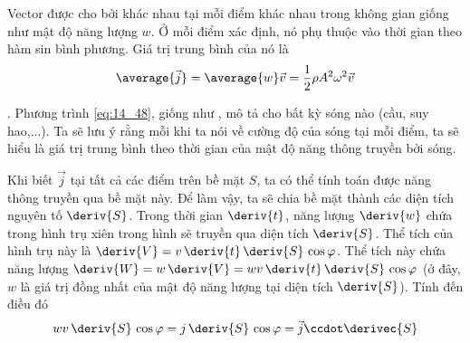 Vector được cho bởi  khác nhau tại mỗi điểm khác nhau trong không gian giống như mật độ năng lượng $w$. Ở mỗi điểm xác định, nó phụ thuộc vào thời gian theo hàm sin bình phương. Giá trị trung bình của nó là
\begin{equation}\label{eq:14_48}
	\average{\vec{j}} = \average{w} \vec{v} = \frac{1}{2} \rho A^2 \omega^2 \vec{v}
\end{equation}

.
Phương trình \eqref{eq:14_48}, giống như , mô tả cho bất kỳ sóng nào (cầu, suy hao,...). Ta sẽ lưu ý rằng mỗi khi ta nói về cường độ của sóng tại mỗi điểm, ta sẽ hiểu là giá trị trung bình theo thời gian của mật độ năng thông truyền bởi sóng.

Khi biết $\vec{j}$ tại tất cả các điểm trên bề mặt $S$, ta có thể tính toán được năng thông truyền qua bề mặt này. Để làm vậy, ta sẽ chia bề mặt thành các diện tích nguyên tố $\deriv{S}$. Trong thời gian $\deriv{t}$, năng lượng $\deriv{w}$ chứa trong hình trụ xiên trong hình  sẽ truyền qua diện tích $\deriv{S}$. Thể tích của hình trụ này là $\deriv{V} = v\, \deriv{t}\, \deriv{S}\, \cos\varphi$. Thể tích này chứa năng lượng $\deriv{W} = w\, \deriv{V} = wv\, \deriv{t}\, \deriv{S}\, \cos\varphi$ (ở đây, $w$ là giá trị đồng nhất của mật độ năng lượng tại diện tích $\deriv{S}$). Tính đến điều đó
\begin{equation*}
	wv\, \deriv{S}\, \cos\varphi = j\, \deriv{S}\, \cos\varphi = \vec{j} \ccdot \derivec{S}
\end{equation*}

